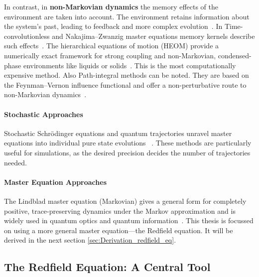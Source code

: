 \noindent
In contrast, in \textbf{non-Markovian dynamics} the memory effects of the environment are taken into account. The environment retains information about the system's past, leading to feedback and more complex evolution~\cite{breuerpetruccione2009theoryopenquantum, rivasetal2014quantumnonmarkovianitycharacterization}.
\noindent
In Time-convolutionless and Nakajima–Zwanzig master equations memory kernels describe such effects~\cite{breuerpetruccione2009theoryopenquantum, rivasetal2014quantumnonmarkovianitycharacterization}. The hierarchical equations of motion (HEOM) provide a numerically exact framework for strong coupling and non-Markovian, condensed-phase environments like liquids or solids~\cite{tanimura2020numericallyexactapproach}. This is the most computationally expensive method. Also Path-integral methods can be noted. They are based on the Feynman–Vernon influence functional and offer a non-perturbative route to non-Markovian dynamics~\cite{weiss2012quantumdissipativesystems}.


\paragraph{Stochastic Approaches}

\noindent
Stochastic Schrödinger equations and quantum trajectories unravel master equations into individual pure state evolutions ~\cite{vogtetal2013stochasticblochredfieldtheory, breuerpetruccione2009theoryopenquantum, carmichael1993opensystemsapproach}. These methods are particularly useful for simulations, as the desired precision decides the number of trajectories needed.

\paragraph{Master Equation Approaches}

\noindent
The Lindblad master equation (Markovian) gives a general form for completely positive, trace-preserving dynamics under the Markov approximation and is widely used in quantum optics and quantum information~\cite{breuerpetruccione2009theoryopenquantum, lindblad1976generatorsquantumdynamical}. 
This thesis is focussed on using a more general master equation—the Redfield equation. It will be derived in the next section \ref{sec:Derivation_redfield_eq}.


\subsection{The Redfield Equation: A Central Tool}


